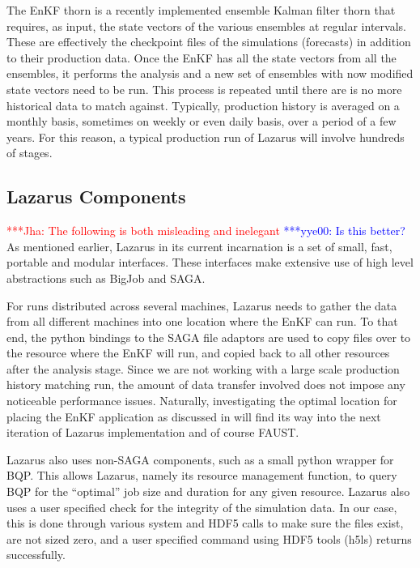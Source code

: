 \documentclass[conference,final]{IEEEtran}
\newcommand{\jhanote}[1]{ {\textcolor{red} { ***Jha: #1 }}}
\newcommand{\yyenote}[1]{ {\textcolor{blue} { ***yye00: #1 }}}
\newcommand{\jhanote}[1]{}
\newcommand{\yyenote}[1]{}
\begin{document}
The EnKF thorn is a recently implemented ensemble Kalman filter
thorn that requires, as input, the state vectors of the various
ensembles at regular intervals. These are effectively the checkpoint
files of the simulations (forecasts) in addition to their production
data. Once the EnKF has all the state vectors from all the ensembles, 
it performs the analysis and a new set of ensembles with now modified
state vectors need to be run. This process is repeated until there
are is no more historical data to match against. Typically,
production history is averaged on a monthly basis, sometimes on weekly
or even daily basis, over a period of a few years. For this reason,
a typical production run of Lazarus will involve hundreds of stages.

\subsection{Lazarus Components}

\jhanote{The following is both misleading and inelegant} \yyenote{Is this better?}
As mentioned
earlier, Lazarus in its current incarnation is a set of small, fast,
portable and modular interfaces. These interfaces make extensive use
of high level abstractions such as BigJob and SAGA.

For runs distributed across several machines, Lazarus needs to gather
the data from all different machines into one location where the EnKF
can run. To that end, the python bindings to the SAGA file adaptors are used
to copy files over to the resource where the EnKF will run, and copied
back to all other resources after the analysis stage. Since we are not working
with a large scale production history matching run, the amount
of data transfer involved does not impose any noticeable performance issues. Naturally,
investigating the optimal location for placing the EnKF application
as discussed in \cite{escience07} will find its way into the next iteration
of Lazarus implementation and of course FAUST.

Lazarus also uses non-SAGA components, such as a small python wrapper
for BQP. This allows Lazarus, namely its resource management function, to query
BQP for the ``optimal'' job size and duration for any given resource. Lazarus
also uses a user specified check for the integrity of the simulation data. In our
case, this is done through various system and HDF5 calls to make sure the files exist,
are not sized zero, and a user specified command using HDF5 tools (h5ls) returns successfully.
\end{document}
